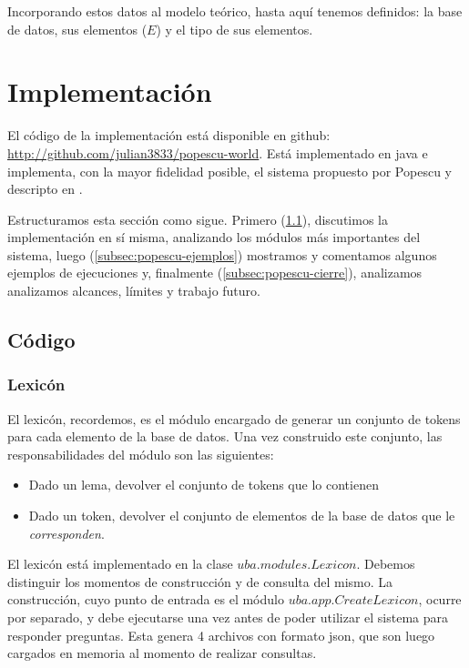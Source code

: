 Incorporando estos datos al modelo teórico, hasta aquí tenemos definidos: la base de datos, sus elementos ($E$) y el tipo de sus elementos.


\section{Implementación}
\label{sec:popescu-implementacion}

El código de la implementación está disponible en github: \url{http://github.com/julian3833/popescu-world}. Está implementado en java e implementa, con la mayor fidelidad posible, el sistema propuesto por Popescu y descripto en .

Estructuramos esta sección como sigue. Primero (\ref{subsec:popescu-codigo}), discutimos la implementación en sí misma, analizando los módulos más importantes del sistema, luego (\ref{subsec:popescu-ejemplos}) mostramos y comentamos algunos ejemplos de ejecuciones y, finalmente (\ref{subsec:popescu-cierre}), analizamos analizamos alcances, límites y trabajo futuro.

\subsection{Código}
\label{subsec:popescu-codigo}

\subsubsection*{Lexicón}
\label{subsubsec:lexicon}
El lexicón, recordemos, es el módulo encargado de generar un conjunto de tokens para cada  elemento de la base de datos. Una vez construido este conjunto, las responsabilidades del módulo son las siguientes:
\begin{itemize}
	\item Dado un lema, devolver el conjunto de tokens que lo contienen
	\item Dado un token, devolver el conjunto de elementos de la base de datos que le \textit{corresponden}.
\end{itemize}

El lexicón está implementado en la clase $uba.modules.Lexicon$. Debemos distinguir los momentos de construcción y de consulta del mismo. La construcción, cuyo punto de entrada es el módulo $uba.app.CreateLexicon$, ocurre por separado, y debe ejecutarse una vez antes de poder utilizar el sistema para responder preguntas. Esta genera 4 archivos con formato json, que son luego cargados en memoria al momento de realizar consultas.

